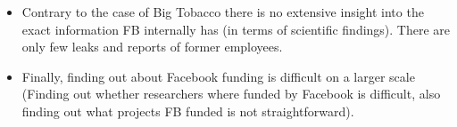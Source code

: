 \begin{enumerate}
\begin{itemize}
        \item Contrary to the case of Big Tobacco there is no extensive insight into the exact information FB internally has (in terms of scientific findings). There are only few leaks and reports of former employees.
        \item Finally, finding out about Facebook funding is difficult on a larger scale (Finding out whether researchers where funded by Facebook is difficult, also finding out what projects FB funded is not straightforward).
    \end{itemize}
\end{enumerate}